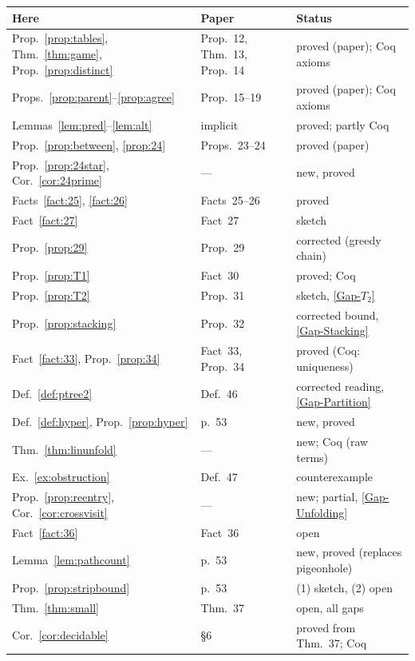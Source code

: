 \documentclass[11pt]{article}
\theoremstyle{plain}
\theoremstyle{definition}
\theoremstyle{remark}
\newcommand{\GapTtwo}{\hyperref[gap:T2]{[Gap-$T_2$]}}
\newcommand{\GapStacking}{\hyperref[gap:stacking]{[Gap-Stacking]}}
\newcommand{\GapPartition}{\hyperref[gap:ptree]{[Gap-Partition]}}
\newcommand{\GapUnfolding}{\hyperref[gap:unfold]{[Gap-Unfolding]}}
\begin{document}
\begin{center}
\small
\begin{tabular}{lll}
Here & Paper & Status\\\hline
Prop.~\ref{prop:tables}, Thm.~\ref{thm:game}, Prop.~\ref{prop:distinct} & Prop.~12, Thm.~13, Prop.~14 & proved (paper); Coq axioms\\
Props.~\ref{prop:parent}--\ref{prop:agree} & Prop.~15--19 & proved (paper); Coq axioms\\
Lemmas~\ref{lem:pred}--\ref{lem:alt} & implicit & proved; partly Coq\\
Prop.~\ref{prop:between}, \ref{prop:24} & Props.~23--24 & proved (paper)\\
Prop.~\ref{prop:24star}, Cor.~\ref{cor:24prime} & --- & new, proved\\
Facts~\ref{fact:25}, \ref{fact:26} & Facts~25--26 & proved\\
Fact~\ref{fact:27} & Fact~27 & sketch\\
Prop.~\ref{prop:29} & Prop.~29 & corrected (greedy chain)\\
Prop.~\ref{prop:T1} & Fact~30 & proved; Coq\\
Prop.~\ref{prop:T2} & Prop.~31 & sketch, \GapTtwo{}\\
Prop.~\ref{prop:stacking} & Prop.~32 & corrected bound, \GapStacking{}\\
Fact~\ref{fact:33}, Prop.~\ref{prop:34} & Fact~33, Prop.~34 & proved (Coq: uniqueness)\\
Def.~\ref{def:ptree2} & Def.~46 & corrected reading, \GapPartition{}\\
Def.~\ref{def:hyper}, Prop.~\ref{prop:hyper} & p.~53 & new, proved\\
Thm.~\ref{thm:linunfold} & --- & new; Coq (raw terms)\\
Ex.~\ref{ex:obstruction} & Def.~47 & counterexample\\
Prop.~\ref{prop:reentry}, Cor.~\ref{cor:crossvisit} & --- & new; partial, \GapUnfolding{}\\
Fact~\ref{fact:36} & Fact~36 & open\\
Lemma~\ref{lem:pathcount} & p.~53 & new, proved (replaces pigeonhole)\\
Prop.~\ref{prop:stripbound} & p.~53 & (1) sketch, (2) open\\
Thm.~\ref{thm:small} & Thm.~37 & open, all gaps\\
Cor.~\ref{cor:decidable} & \S6 & proved from Thm.~37; Coq
\end{tabular}
\end{center}
\end{document}
